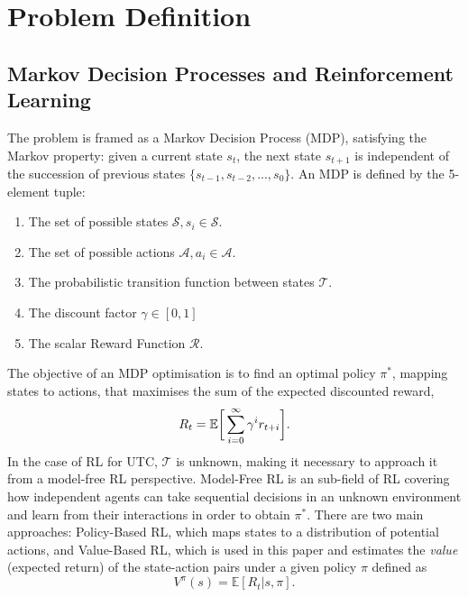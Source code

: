 \documentclass[sigconf,anonymous]{aamas}
\begin{document}
\section{Problem Definition}
\label{problem}
\subsection{Markov Decision Processes and Reinforcement Learning}
The problem is framed as a Markov Decision Process (MDP), satisfying the Markov property: given a current state $s_t$, the next state $s_{t+1}$ is independent of the succession of previous states $\{s_{t-1}, s_{t-2}, ..., s_0\}$.
An MDP is defined by the 5-element tuple:
\begin{enumerate}
\item The set of possible states $\mathcal{S}, s_i\in \mathcal{S}$.
\item The set of possible actions $\mathcal{A}, a_i\in \mathcal{A}$.
\item The probabilistic transition function between states $\mathcal{T}$.
\item The discount factor $\gamma \in [0,1]$ 
\item The scalar Reward Function $\mathcal{R}$. 
\end{enumerate}

The objective of an MDP optimisation is to find an optimal policy $\pi^*$, mapping states to actions, that maximises the sum of the expected discounted reward,
\begin{equation}
R_t = \mathbb{E} \bigg{[} \sum^{\infty}_{i=0} \gamma^i r_{t+i} \bigg{]} .
\label{eq:reward}
\end{equation}
In the case of RL for UTC, $\mathcal{T}$ is unknown, making it necessary to approach it from a model-free RL perspective.
Model-Free RL is an sub-field of RL covering how independent agents can take sequential decisions in an unknown environment and learn from their interactions in order to obtain $\pi^*$. 
There are two main approaches: Policy-Based RL, which maps states to a distribution of potential actions, and Value-Based RL, which is used in this paper and estimates the {\em value} (expected return) of the state-action pairs under a given policy $\pi$ defined  as
\begin{equation}
V^{\pi}(s) = \mathbb{E} [R_t|s,\pi].
\label{eq:value}
\end{equation}
\end{document}
